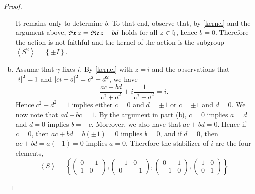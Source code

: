 \documentclass[10pt]{amsart}
\begin{document}
\begin{thm}
\begin{proof}
\begin{enumerate}[(a)]
	    It remains only to determine $b$.  
	    To that end, observe that, by \eqref{kernel} and the argument above, $\operatorname{\mathfrak{Re}}z = \operatorname{\mathfrak{Re}}z + bd$ holds for all $z \in \mathfrak{h}$, hence $b = 0$.
	    Therefore the action is not faithful and the kernel of the action is the subgroup $\left<S^2\right> = \left\{\pm I \right\}$.
	  \item
	    Assume that $\gamma$ fixes $i$.
	    By \eqref{kernel} with $z = i$ and the observations that $\left\lvert i \right\rvert^2 = 1$ and $\left\lvert ci + d \right\rvert^2 = c^2 + d^2$, we have 
	    $$\frac{ac + bd}{c^2+d^2} + i\frac{1}{c^2+d^2} = i.$$
	    Hence $c^2 + d^2 = 1$ implies either $c = 0$ and $d = \pm 1$ or $c = \pm 1$ and $d = 0$.
	    We now note that $ad - bc = 1$.
	    By the argument in part (b), $c = 0$ implies $a = d$ and $d = 0$ implies $b = -c$.
	    Moreover, we also have that $ac + bd = 0$.
	    Hence if $c = 0$, then $ac + bd = b(\pm 1) = 0$ implies $b = 0$, and if $d = 0$, then $ac + bd = a(\pm1) = 0$ implies $a = 0$.
	    Therefore the stabilizer of $i$ are the four elements, $$\left<S\right> = \left\{
	    \left(\begin{array}{cc} 0 & -1\\1 & 0\end{array}\right), 
	      \left(\begin{array}{cc} -1 & 0\\0 & -1\end{array}\right),
		\left(\begin{array}{cc} 0 & 1\\-1 & 0\end{array}\right),
		  \left(\begin{array}{cc} 1 & 0\\0 & 1\end{array}\right)\right\}$$
		    
      \end{enumerate}
  \end{proof}
\end{thm}
\end{document}
